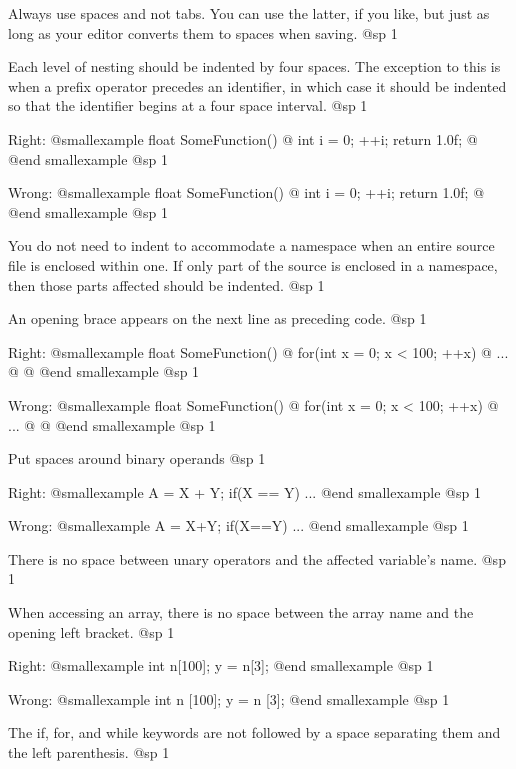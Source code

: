 \item
Always use spaces and not tabs. You can use the latter, if you like, but just as long as your editor converts them to spaces when saving.
@sp 1

\item
Each level of nesting should be indented by four spaces. The exception to this is when a prefix operator precedes an identifier, in which case it should be indented so that the identifier begins at a four space interval.
@sp 1

Right:
@smallexample
float SomeFunction()
@{
    int i = 0;
  ++i;
    return 1.0f;
@}
@end smallexample
@sp 1

Wrong:
@smallexample
float SomeFunction()
@{
    int i = 0;
    ++i;
        return 1.0f;
@}
@end smallexample
@sp 1

\item
You do not need to indent to accommodate a namespace when an entire source file is enclosed within one. If only part of the source is enclosed in a namespace, then those parts affected should be indented.
@sp 1

\item
An opening brace appears on the next line as preceding code.
@sp 1

Right:
@smallexample
float SomeFunction()
@{
    for(int x = 0; x < 100; ++x)
    @{
        ...
    @}
@}
@end smallexample
@sp 1

Wrong:
@smallexample
float SomeFunction() @{
    for(int x = 0; x < 100; ++x) @{
        ...
    @}
@}
@end smallexample
@sp 1

\item
Put spaces around binary operands
@sp 1

Right:
@smallexample
A = X + Y;
if(X == Y)
    ...
@end smallexample
@sp 1

Wrong:
@smallexample
A = X+Y;
if(X==Y)
    ...
@end smallexample
@sp 1

\item
There is no space between unary operators and the affected variable's name.
@sp 1

\item
When accessing an array, there is no space between the array name and the opening left bracket. 
@sp 1

Right:
@smallexample
int n[100];
y = n[3];
@end smallexample
@sp 1

Wrong:
@smallexample
int n [100];
y = n [3];
@end smallexample
@sp 1

\item
The if, for, and while keywords are not followed by a space separating them and the left parenthesis. 
@sp 1

